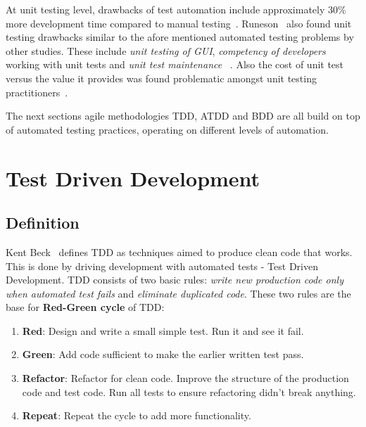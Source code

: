    At unit testing level, drawbacks of test automation include approximately 30\% more development time compared to manual testing~\cite{williams2009effectiveness}.
    Runeson~\cite{runeson2006survey} also found unit testing drawbacks similar to the afore mentioned automated testing problems by other studies.
    These include \textit{unit testing of GUI}, \textit{competency of developers} working with unit tests and \textit{unit test maintenance}~\cite{runeson2006survey} .
    Also the cost of unit test versus the value it provides was found problematic amongst unit testing practitioners~\cite{runeson2006survey}.

    The next sections agile methodologies TDD, ATDD and BDD are all build on top of automated testing practices, operating on different levels
    of automation.

\section{Test Driven Development} %
    \subsection{Definition}
    Kent Beck~\cite{beck2003test} defines TDD as techniques aimed to produce clean code that works.
    This is done by driving development with automated tests - Test Driven Development. TDD consists of two basic rules:
    \textit{write new production code only when automated test fails} and
    \textit{eliminate duplicated code}. These two rules are the base for \textbf{Red-Green cycle} of TDD:

    \begin{enumerate}
    \item \textbf{Red}: Design and write a small simple test. Run it and see it fail.
    \item \textbf{Green}: Add code sufficient to make the earlier written test pass.
    \item \textbf{Refactor}: Refactor for clean code. Improve the structure of the production code and test code.
    Run all tests to ensure refactoring didn't break anything.
    \item \textbf{Repeat}: Repeat the cycle to add more functionality.
    \end{enumerate}

